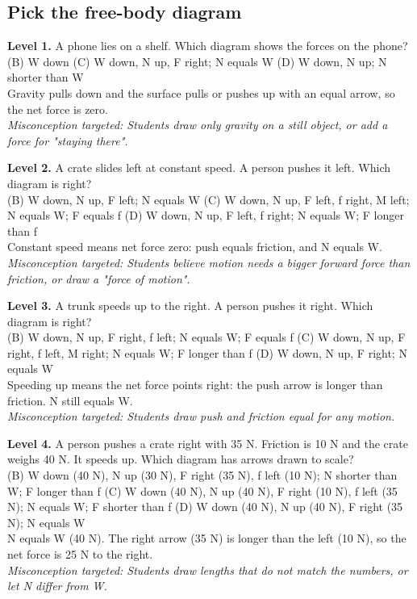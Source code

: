 \documentclass[11pt]{article}
\begin{document}
\subsection*{Pick the free-body diagram}
\noindent\textbf{Level 1.} A phone lies on a shelf. Which diagram shows the forces on the phone?\\  \quad (B) W down \quad (C) W down, N up, F right; N equals W \quad (D) W down, N up; N shorter than W\\  \quad Gravity pulls down and the surface pulls or pushes up with an equal arrow, so the net force is zero.\\ \textit{Misconception targeted: Students draw only gravity on a still object, or add a force for "staying there".}\par\medskip
\noindent\textbf{Level 2.} A crate slides left at constant speed. A person pushes it left. Which diagram is right?\\  \quad (B) W down, N up, F left; N equals W \quad (C) W down, N up, F left, f right, M left; N equals W; F equals f \quad (D) W down, N up, F left, f right; N equals W; F longer than f\\  \quad Constant speed means net force zero: push equals friction, and N equals W.\\ \textit{Misconception targeted: Students believe motion needs a bigger forward force than friction, or draw a "force of motion".}\par\medskip
\noindent\textbf{Level 3.} A trunk speeds up to the right. A person pushes it right. Which diagram is right?\\  \quad (B) W down, N up, F right, f left; N equals W; F equals f \quad (C) W down, N up, F right, f left, M right; N equals W; F longer than f \quad (D) W down, N up, F right; N equals W\\  \quad Speeding up means the net force points right: the push arrow is longer than friction. N still equals W.\\ \textit{Misconception targeted: Students draw push and friction equal for any motion.}\par\medskip
\noindent\textbf{Level 4.} A person pushes a crate right with 35 N. Friction is 10 N and the crate weighs 40 N. It speeds up. Which diagram has arrows drawn to scale?\\  \quad (B) W down (40 N), N up (30 N), F right (35 N), f left (10 N); N shorter than W; F longer than f \quad (C) W down (40 N), N up (40 N), F right (10 N), f left (35 N); N equals W; F shorter than f \quad (D) W down (40 N), N up (40 N), F right (35 N); N equals W\\  \quad N equals W (40 N). The right arrow (35 N) is longer than the left (10 N), so the net force is 25 N to the right.\\ \textit{Misconception targeted: Students draw lengths that do not match the numbers, or let N differ from W.}\par\medskip
\end{document}

